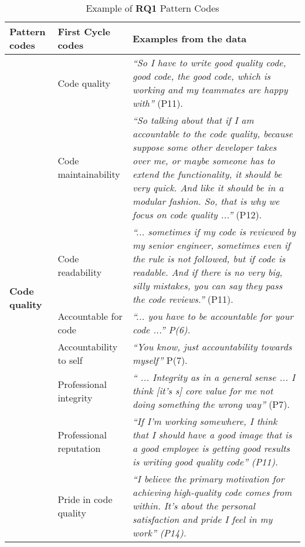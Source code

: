 \begin{table*}[th!]
\footnotesize
    \caption{Example of \textbf{RQ1} Pattern Codes}

    \label{tab:themes}
    \renewcommand\arraystretch{1.8}
    
    \begin{tabular}{p{3.2cm}p{2.8cm}p{6.5cm}}
    \toprule
      \textbf{Pattern codes} & \textbf{First Cycle codes} & \textbf{Examples from the data}\\
      \hline
      
      \multirow{8}{*}{\textbf{Code quality}} & Code quality  & \emph{``So I have to write good quality code, good code, the good code, which is working and my teammates are happy with''} (P11).\\
      
      & Code maintainability & \emph{``So talking about that if I am accountable to the code quality, because suppose some other developer takes over me, or maybe someone has to extend the functionality, it should be very quick. And like it should be in a modular fashion. So, that is why we focus on code quality ...''} (P12). \\
      
      & Code readability  & \emph{``... sometimes if my code is reviewed by my senior engineer, sometimes even if the rule is not followed, but if code is readable. And if there is no very big, silly mistakes, you can say they pass the code reviews.''} (P11). \\
      \hline
      
      \multirow{2}{4.1cm}{\textbf{Individual accountability}} & Accountable for code  & \emph{``... you have to be accountable for your code ...'' P(6).} \\
      
      & Accountability to self  & \emph{``You know, just accountability towards myself''} P(7).  \\ \hline

      \multirow{6}{*}{\textbf{Intrinsic drivers}} &  Professional integrity & \emph{`` ... Integrity as in a general sense ... I think [it's s] core value for me not doing something the wrong way''} (P7). \\
      
      & Professional reputation & \emph{``If I'm working somewhere, I think that I should have a good image that is a good employee is getting good results is writing good quality code'' (P11).}  \\
      
      & Pride in code quality & \emph{``I believe the primary motivation for achieving high-quality code comes from within. It's about the personal satisfaction and pride I feel in my work'' (P14).}  \\
      
     \bottomrule
     
    \end{tabular}
  
\end{table*}

